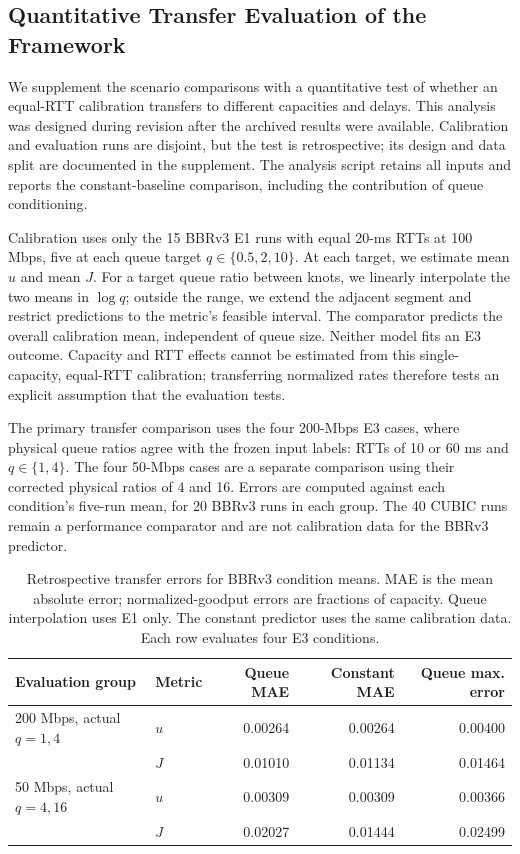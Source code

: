 \subsection{Quantitative Transfer Evaluation of the Framework}
\label{sec:framework_transfer}

We supplement the scenario comparisons with a quantitative test of whether
an equal-RTT calibration transfers to different capacities and delays.
This analysis was designed during revision after the archived results were
available. Calibration and evaluation runs are disjoint, but the test is
retrospective; its design and data split are documented in the supplement.
The analysis script retains all inputs and reports the constant-baseline
comparison, including the contribution of queue conditioning.

Calibration uses only the 15 BBRv3 E1 runs with equal 20-ms RTTs at
100 Mbps, five at each queue target $q\in\{0.5,2,10\}$. At each target,
we estimate mean $u$ and mean $J$. For a target queue ratio between knots,
we linearly interpolate the two means in $\log q$; outside the range,
we extend the adjacent segment and restrict predictions to the metric's
feasible interval. The comparator predicts the overall calibration mean,
independent of queue size. Neither model fits an E3 outcome. Capacity and
RTT effects cannot be estimated from this single-capacity, equal-RTT
calibration; transferring normalized rates therefore tests an explicit
assumption that the evaluation tests.

The primary transfer comparison uses the four 200-Mbps E3 cases, where
physical queue ratios agree with the frozen input labels: RTTs of 10 or
60 ms and $q\in\{1,4\}$. The four 50-Mbps cases are a separate comparison
using their corrected physical ratios of 4 and 16. Errors are computed
against each condition's five-run mean, for 20 BBRv3 runs in each group.
The 40 CUBIC runs remain a performance comparator and are not calibration
data for the BBRv3 predictor.

\begin{table}[htbp]
\centering
\small
\caption{Retrospective transfer errors for BBRv3 condition means. MAE is the
mean absolute error; normalized-goodput errors are fractions of capacity.
Queue interpolation uses E1 only. The constant predictor uses the same
calibration data. Each row evaluates four E3 conditions.}
\label{tab:framework_transfer}
\begin{tabular}{llrrr}
\toprule
Evaluation group & Metric & Queue MAE & Constant MAE & Queue max. error \\
\midrule
200 Mbps, actual $q=1,4$ & $u$ & 0.00264 & 0.00264 & 0.00400 \\
 & $J$ & 0.01010 & 0.01134 & 0.01464 \\
50 Mbps, actual $q=4,16$ & $u$ & 0.00309 & 0.00309 & 0.00366 \\
 & $J$ & 0.02027 & 0.01444 & 0.02499 \\
\bottomrule
\end{tabular}
\end{table}

